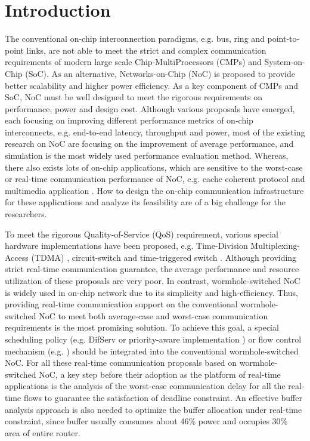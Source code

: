 \documentclass[10pt,journal]{IEEEtran}
\begin{document}
\section{Introduction}
The conventional on-chip interconnection paradigms, e.g. bus, ring and point-to-point links, are not able to meet the strict and complex communication requirements of modern large scale Chip-MultiProcessors (CMPs) and System-on-Chip (SoC). As an alternative, Networks-on-Chip (NoC) is proposed to provide better scalability and higher power efficiency. As a key component of CMPs and SoC, NoC must be well designed to meet the rigorous requirements on performance, power and design cost. Although various proposals have emerged, each focusing on improving different performance metrics of on-chip interconnects, e.g. end-to-end latency, throughput and power, most of the existing research on NoC are focusing on the improvement of average performance, and simulation is the most widely used performance evaluation method. Whereas, there also exists lots of on-chip applications, which are sensitive to the worst-case or real-time communication performance of NoC, e.g. cache coherent protocol \cite{Bolotin2007} and multimedia application \cite{ostermann2004video}. How to design the on-chip communication infrastructure for these applications and analyze its feasibility are of a big challenge for the researchers.

To meet the rigorous Quality-of-Service (QoS) requirement, various special hardware implementations have been proposed, e.g. Time-Division Multiplexing-Access (TDMA) \cite{GoDR05}, circuit-switch \cite{6628254} and time-triggered switch \cite{4617280}. Although providing strict real-time communication guarantee, the average performance and resource utilization of these proposals are very poor. In contrast, wormhole-switched NoC is widely used in on-chip network due to its simplicity and high-efficiency. Thus, providing real-time communication support on the conventional wormhole-switched NoC to meet both average-case and worst-case communication requirements is the most promising solution. To achieve this goal, a special scheduling policy (e.g. DifServ \cite{1411140} or priority-aware implementation \cite{Shi:2008:RCA:1397757.1397996}\cite{708526}\cite{627905}) or flow control mechanism (e.g. \cite{Li199649}\cite{707545}) should be integrated into the conventional wormhole-switched NoC. For all these real-time communication proposals based on wormhole-switched NoC, a key step before their adoption as the platform of real-time applications is the analysis of the worst-case communication delay for all the real-time flows to guarantee the satisfaction of deadline constraint. An effective buffer analysis approach is also needed to optimize the buffer allocation under real-time constraint, since buffer usually consumes about 46\% power \cite{pkundu} and occupies 30\% area \cite{5507566} of entire router.
\end{document}
